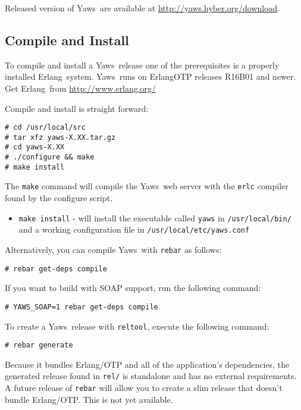 \documentclass[11pt,oneside,english]{book}
\newcommand{\Erlang}            %
        {{\sc Erlang}}
\newcommand{\Yaws}            %
        {{\sc Yaws}}
\begin{document}
Released version of \Yaws\ are available at
\url{http://yaws.hyber.org/download}.

\subsection{Compile and Install}

To compile and install a \Yaws\  release
one of the prerequisites is a properly installed \Erlang\  system. \Yaws\
runs on \Erlang\/OTP releases R16B01 and newer. Get \Erlang\  from
\url{http://www.erlang.org/}

Compile and install is straight forward:
\begin{verbatim}
# cd /usr/local/src
# tar xfz yaws-X.XX.tar.gz
# cd yaws-X.XX
# ./configure && make
# make install
\end{verbatim}

The \verb+make+ command will compile the \Yaws\  web server with the
\verb+erlc+ compiler found by the configure script.

\begin{itemize}

\item  \verb+make install+ - will install the executable called
         \verb+yaws+ in \verb+/usr/local/bin/+ and a working
         configuration file in \verb+/usr/local/etc/yaws.conf+

\end{itemize}

Alternatively, you can compile \Yaws\  with \verb+rebar+ as follows:

\begin{verbatim}
# rebar get-deps compile
\end{verbatim}

If you want to build with SOAP support, run the following command:

\begin{verbatim}
# YAWS_SOAP=1 rebar get-deps compile
\end{verbatim}

To create a \Yaws\  release with \verb+reltool+, execute the following
command:

\begin{verbatim}
# rebar generate
\end{verbatim}

Because it bundles Erlang/OTP and all of the application's dependencies,
the generated release found in \verb+rel/+ is standalone and has no
external requirements. A future release of \verb+rebar+ will allow you
to create a slim release that doesn't bundle Erlang/OTP. This is not yet
available.
\end{document}
